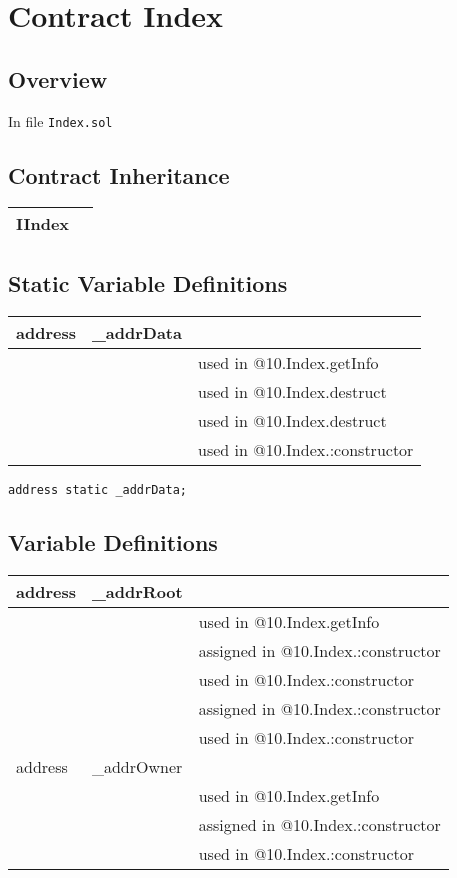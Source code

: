 
\chapter{Contract Index}

\minitoc

\section{Overview}


In file {\tt Index.sol}

\section{Contract Inheritance}


\noindent\begin{tabular}{|l|p{5cm}|}\hline
IIndex & \\\hline
\end{tabular}


\section{Static Variable Definitions}


\ifsoltables
\noindent\begin{tabular}{|l|l|p{5cm}|}\hline
address & \_{}addrData &  \\\hline
 & & used in @10.Index.getInfo\\\hline
 & & used in @10.Index.destruct\\\hline
 & & used in @10.Index.destruct\\\hline
 & & used in @10.Index.:constructor\\\hline
\end{tabular}
\fi


\begin{lstlisting}[firstnumber=13]
    address static _addrData;
\end{lstlisting}

\section{Variable Definitions}


\ifsoltables
\noindent\begin{tabular}{|l|l|p{5cm}|}\hline
address & \_{}addrRoot &  \\\hline
 & & used in @10.Index.getInfo\\\hline
 & & assigned in @10.Index.:constructor\\\hline
 & & used in @10.Index.:constructor\\\hline
 & & assigned in @10.Index.:constructor\\\hline
 & & used in @10.Index.:constructor\\\hline
address & \_{}addrOwner &  \\\hline
 & & used in @10.Index.getInfo\\\hline
 & & assigned in @10.Index.:constructor\\\hline
 & & used in @10.Index.:constructor\\\hline
\end{tabular}
\fi


